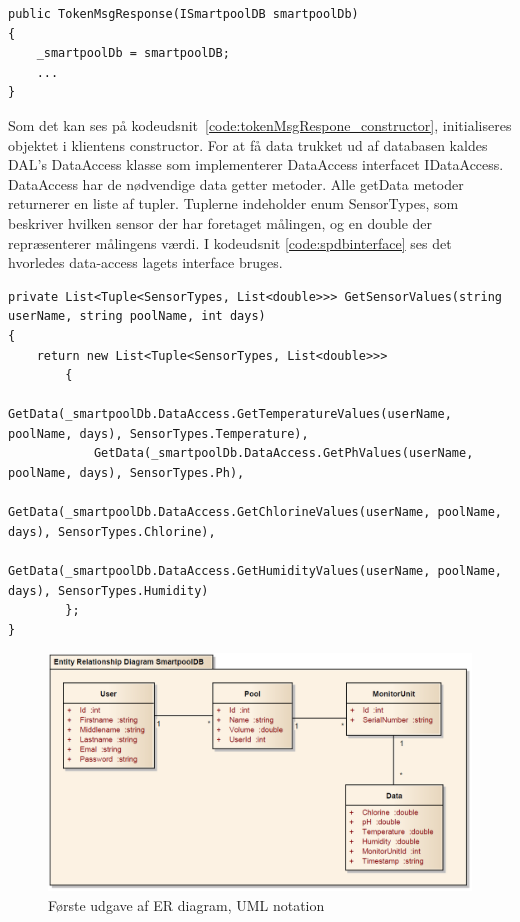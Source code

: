 \begin{lstlisting}[caption=TokenMsgResponse constructor,label=code:tokenMsgRespone_constructor]
public TokenMsgResponse(ISmartpoolDB smartpoolDb)
{
	_smartpoolDb = smartpoolDB;
	...
}
\end{lstlisting}

Som det kan ses på kodeudsnit~\ref{code:tokenMsgRespone_constructor}, initialiseres objektet i klientens constructor.
For at få data trukket ud af databasen kaldes DAL's DataAccess klasse som implementerer DataAccess interfacet IDataAccess. DataAccess har de nødvendige data getter metoder. 
Alle getData metoder returnerer en liste af tupler. Tuplerne indeholder enum SensorTypes, som beskriver hvilken sensor der har foretaget målingen, og en double der repræsenterer målingens værdi. I kodeudsnit \ref{code:spdbinterface} ses det hvorledes data-access lagets interface bruges.

\begin{lstlisting}[caption=\gls{windserver}'s kald ind gennem Data access lagets interface, label=code:spdbinterface]
private List<Tuple<SensorTypes, List<double>>> GetSensorValues(string userName, string poolName, int days)
{
	return new List<Tuple<SensorTypes, List<double>>>
		{
			GetData(_smartpoolDb.DataAccess.GetTemperatureValues(userName, poolName, days), SensorTypes.Temperature),
			GetData(_smartpoolDb.DataAccess.GetPhValues(userName, poolName, days), SensorTypes.Ph),
			GetData(_smartpoolDb.DataAccess.GetChlorineValues(userName, poolName, days), SensorTypes.Chlorine),
			GetData(_smartpoolDb.DataAccess.GetHumidityValues(userName, poolName, days), SensorTypes.Humidity)
		};
}
\end{lstlisting}

\begin{figure}[h]
	\centering
	\includegraphics[width=\linewidth]{figs/design/databaseERD_old_uml}
	\caption{Første udgave af ER diagram, UML notation}
	\label{fig:databaseERD_old_uml}
\end{figure}

